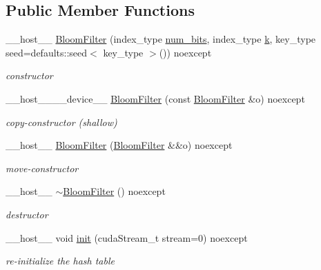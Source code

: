 \subsection*{Public Member Functions}
\begin{DoxyCompactItemize}
\item 
\+\_\+\+\_\+host\+\_\+\+\_\+ \hyperlink{classwarpcore_1_1BloomFilter_a0050427179ed9b718800a42f9eeedb36}{Bloom\+Filter} (index\+\_\+type \hyperlink{classwarpcore_1_1BloomFilter_a54a25926cf770e834c47ad5164e91443}{num\+\_\+bits}, index\+\_\+type \hyperlink{classwarpcore_1_1BloomFilter_a33c972e8a462625d6253b58bbd5585f3}{k}, key\+\_\+type seed=defaults\+::seed$<$ key\+\_\+type $>$()) noexcept
\begin{DoxyCompactList}\small\item\em constructor \end{DoxyCompactList}\item 
\+\_\+\+\_\+host\+\_\+\+\_\+\+\_\+\+\_\+device\+\_\+\+\_\+ \hyperlink{classwarpcore_1_1BloomFilter_a883979f0bdf59e494c366eef343ea7b4}{Bloom\+Filter} (const \hyperlink{classwarpcore_1_1BloomFilter}{Bloom\+Filter} \&o) noexcept
\begin{DoxyCompactList}\small\item\em copy-\/constructor (shallow) \end{DoxyCompactList}\item 
\+\_\+\+\_\+host\+\_\+\+\_\+ \hyperlink{classwarpcore_1_1BloomFilter_aa0a03f44ed1c877335537a1e3fcb9208}{Bloom\+Filter} (\hyperlink{classwarpcore_1_1BloomFilter}{Bloom\+Filter} \&\&o) noexcept
\begin{DoxyCompactList}\small\item\em move-\/constructor \end{DoxyCompactList}\item 
\mbox{\label{classwarpcore_1_1BloomFilter_a43381c51633999d04e0002c32885e3b7}} 
\+\_\+\+\_\+host\+\_\+\+\_\+ \hyperlink{classwarpcore_1_1BloomFilter_a43381c51633999d04e0002c32885e3b7}{$\sim$\+Bloom\+Filter} () noexcept
\begin{DoxyCompactList}\small\item\em destructor \end{DoxyCompactList}\item 
\+\_\+\+\_\+host\+\_\+\+\_\+ void \hyperlink{classwarpcore_1_1BloomFilter_ac9e663f21e94822fc214b75c623436f5}{init} (cuda\+Stream\+\_\+t stream=0) noexcept
\begin{DoxyCompactList}\small\item\em re-\/initialize the hash table \end{DoxyCompactList}\item 

\end{DoxyCompactItemize}
